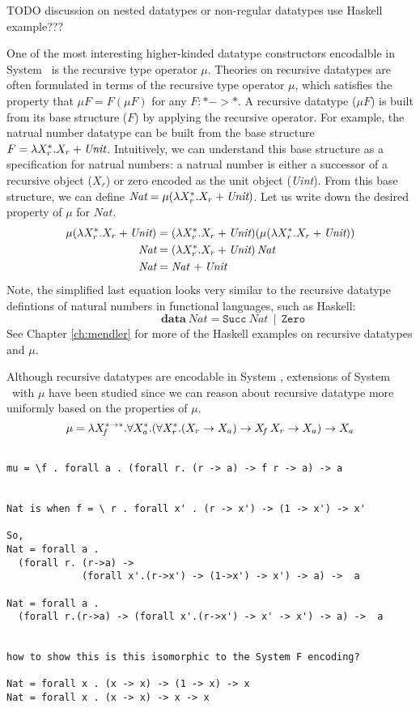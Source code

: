 TODO discussion on nested datatypes or non-regular datatypes
use Haskell example???

One of the most interesting higher-kinded datatype constructors
encodalble in System \Fw\ is the recursive type operator $\mu$.
Theories on recursive datatypes are often formulated in terms of
the recursive type operator $\mu$, which satisfies the property
that $\mu F = F (\mu F)$ for any $F: * -> *$. A recursive datatype ($\mu F$)
is built from its base structure ($F$) by applying the recursive operator.
For example, the natrual number datatype can be built from the base structure
$F = \lambda X_r^{*}.X_r + \textit{Unit}$. Intuitively, we can understand this
base structure as a specification for natrual numbers: a natrual number is
either a successor of a recursive object ($X_r$)
or zero encoded as the unit object (\textit{Uint}).
From this base structure, we can define
$\textit{Nat} = \mu(\lambda X_r^{*}.X_r + \textit{Unit})$.
Let us write down the desired property of $\mu$ for $\textit{Nat}$.
\begin{align*}
\mu(\lambda X_r^{*}.X_r + \textit{Unit}) &=
(\lambda X_r^{*}.X_r + \textit{Unit})(\mu(\lambda X_r^{*}.X_r + \textit{Unit})) \\
\textit{Nat} &= (\lambda X_r^{*}.X_r + \textit{Unit})\,\textit{Nat} \\
\textit{Nat} &= \textit{Nat}\, + \textit{Unit}
\end{align*}
Note, the simplified last equation looks very similar to
the recursive datatype defintions of natural numbers in functional languages,
such as Haskell: \[ \qquad\qquad
\textbf{data}~\textit{Nat} = \texttt{Succ}~\textit{Nat}\,\mid\,\texttt{Zero} \]
See Chapter \ref{ch:mendler} %
for more of the Haskell examples on recursive datatypes and $\mu$.

Although recursive datatypes are encodable in System \F,
extensions of System \F\ with $\mu$ have been studied %
since we can reason about recursive datatype more uniformly based on
the properties of $\mu$.
\[
\mu =
 \lambda X_{\!f}^{* -> *}.
 \forall X_a^{*}.(\forall X_r^{*}.(X_r -> X_a) -> X_{\!f}\,X_r -> X_a) -> X_a
\]
\begin{verbatim}

mu = \f . forall a . (forall r. (r -> a) -> f r -> a) -> a


Nat is when f = \ r . forall x' . (r -> x') -> (1 -> x') -> x'

So,
Nat = forall a .
  (forall r. (r->a) ->
             (forall x'.(r->x') -> (1->x') -> x') -> a) ->  a

Nat = forall a .
  (forall r.(r->a) -> (forall x'.(r->x') -> x' -> x') -> a) ->  a


how to show this is this isomorphic to the System F encoding?

Nat = forall x . (x -> x) -> (1 -> x) -> x
Nat = forall x . (x -> x) -> x -> x

\end{verbatim}
